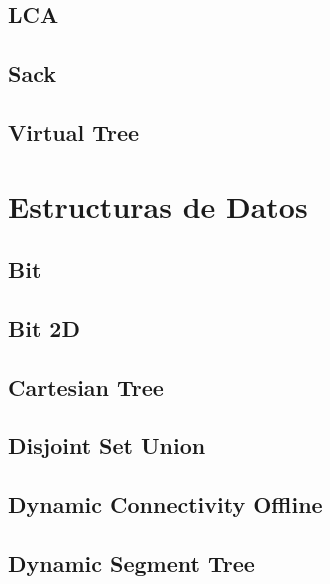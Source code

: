 \subsection{LCA}
\raggedbottom
\hrulefill
\subsection{Sack}
\raggedbottom
\hrulefill
\subsection{Virtual Tree}
\raggedbottom
\hrulefill

\section{Estructuras de Datos}
\subsection{Bit}
\raggedbottom
\hrulefill
\subsection{Bit 2D}
\raggedbottom
\hrulefill
\subsection{Cartesian Tree}
\raggedbottom
\hrulefill
\subsection{Disjoint Set Union}
\raggedbottom
\hrulefill
\subsection{Dynamic Connectivity Offline}
\raggedbottom
\hrulefill
\subsection{Dynamic Segment Tree}
\raggedbottom
\hrulefill
